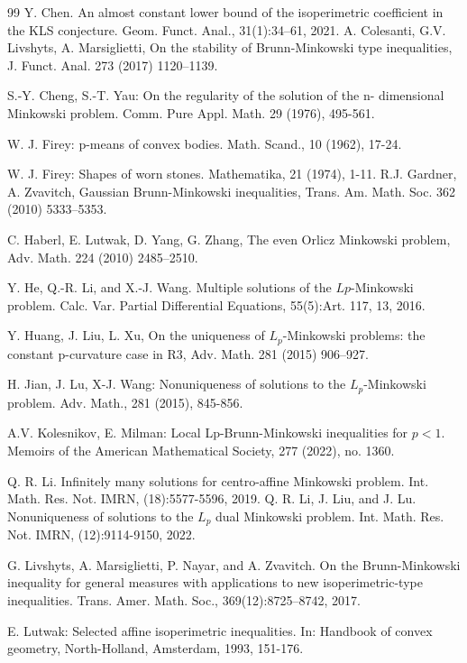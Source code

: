 \documentclass[reqno]{amsart}
\theoremstyle{remark}
\theoremstyle{plain}
\begin{document}
\begin{thebibliography}{99}
Y. Chen. An almost constant lower bound of the isoperimetric coefficient in the KLS
conjecture. Geom. Funct. Anal., 31(1):34–61, 2021.
 A. Colesanti, G.V. Livshyts, A. Marsiglietti, On the stability of Brunn-Minkowski type inequalities, J. Funct. Anal. 273 (2017) 1120–1139.

 S.-Y. Cheng, S.-T. Yau: On the regularity of the solution of the n-
dimensional Minkowski problem. Comm. Pure Appl. Math. 29 (1976),
495-561.

 W. J. Firey: p-means of convex bodies. Math. Scand., 10 (1962), 17-24.

W. J. Firey: Shapes of worn stones. Mathematika, 21 (1974), 1-11.
 R.J. Gardner, A. Zvavitch, Gaussian Brunn-Minkowski inequalities, Trans. Am. Math. Soc. 362 (2010) 5333–5353.

 C. Haberl, E. Lutwak, D. Yang, G. Zhang, The even Orlicz Minkowski problem, Adv. Math. 224 (2010) 2485–2510.



Y. He, Q.-R. Li, and X.-J. Wang. Multiple solutions of the $Lp$-Minkowski problem.
Calc. Var. Partial Differential Equations, 55(5):Art. 117, 13, 2016.

 Y. Huang, J. Liu, L. Xu, On the uniqueness of $L_p$-Minkowski problems: the constant p-curvature case in R3, Adv. Math. 281 (2015) 906–927.


H. Jian, J. Lu, X-J. Wang: Nonuniqueness of solutions to the $L_p$-Minkowski problem. Adv.
Math., 281 (2015), 845-856.

 A.V. Kolesnikov, E. Milman: Local Lp-Brunn-Minkowski inequalities
for $p<1$. Memoirs of the American Mathematical Society, 277 (2022),
no. 1360.

 Q. R. Li. Infinitely many solutions for centro-affine Minkowski problem. Int. Math.
Res. Not. IMRN, (18):5577-5596, 2019.
Q. R. Li, J. Liu, and J. Lu. Nonuniqueness of solutions to the $L_p$ dual Minkowski
problem. Int. Math. Res. Not. IMRN, (12):9114-9150, 2022.

 G. Livshyts, A. Marsiglietti, P. Nayar, and A. Zvavitch. On the Brunn-Minkowski inequality
for general measures with applications to new isoperimetric-type inequalities.
Trans. Amer. Math. Soc., 369(12):8725–8742, 2017.

E. Lutwak: Selected affine isoperimetric inequalities. In: Handbook of
convex geometry, North-Holland, Amsterdam, 1993, 151-176.


\end{thebibliography}
\end{document}
